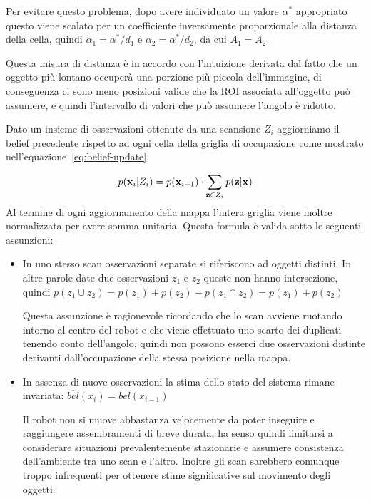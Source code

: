 \documentclass[10pt]{beamer}
\begin{document}
		
	Per evitare questo problema, dopo avere
	individuato un valore $ \alpha ^* $ appropriato questo viene scalato per un
	coefficiente inversamente proporzionale alla distanza della cella, quindi $
	\alpha _1 = \alpha ^*/d_1 $ e $ \alpha _2=\alpha ^*/d_2 $, da cui $A_1=A_2$. 
	
	Questa misura di distanza è in accordo con l'intuizione derivata dal fatto
	che un oggetto più lontano occuperà una porzione più piccola dell'immagine,
	di conseguenza ci sono meno posizioni valide che la ROI associata
	all'oggetto può assumere, e quindi l'intervallo di valori che può assumere
	l'angolo è ridotto.

	
	Dato un insieme di osservazioni ottenute da una scansione $ Z_i $ aggiorniamo il belief precedente rispetto ad ogni cella della griglia di occupazione come mostrato nell'equazione~\ref{eq:belief-update}.

	\begin{equation}\label{eq:belief-update}
		p({\bf x}_i | Z_i) = p({\bf x}_{i-1}) \cdot 
		\sum_{{\bf z} \in Z_i} p({\bf z} | {\bf x})
	\end{equation}
	Al termine di ogni aggiornamento della mappa l'intera griglia viene inoltre
	normalizzata per avere somma unitaria.  
	Questa formula è valida sotto le seguenti assunzioni:
	\begin{itemize}
		\item In uno stesso scan osservazioni separate si riferiscono ad
			oggetti distinti. In altre parole date due osservazioni $z_1$ e
			$z_2$ queste non hanno intersezione, quindi $ p(z_1 \cup z_2) =
			p(z_1)+p(z_2)-p( z_1 \cap z_2) = p(z_1)+p(z_2) $ 

			Questa assunzione è ragionevole ricordando che lo scan avviene
			ruotando intorno al centro del robot e che viene effettuato uno
			scarto dei duplicati tenendo conto dell'angolo, quindi non possono
			esserci due osservazioni distinte derivanti dall'occupazione della
			stessa posizione nella mappa.

		\item In assenza di nuove osservazioni la stima dello stato del sistema
			rimane invariata: $ \overline{bel}(x_i) = bel(x_{i-1}) $ 

			Il robot non si muove abbastanza velocemente da poter inseguire e
			raggiungere assembramenti di breve durata, ha senso quindi
			limitarsi a considerare situazioni prevalentemente stazionarie e
			assumere consistenza dell'ambiente tra uno scan e l'altro. Inoltre
			gli scan sarebbero comunque troppo infrequenti per ottenere stime
			significative sul movimento degli oggetti.

	\end{itemize}
\end{document}
